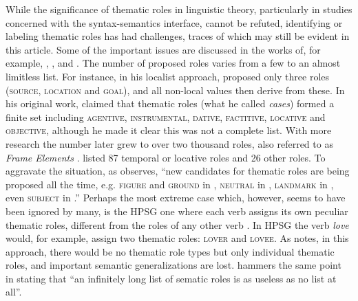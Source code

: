 \documentclass[output=paper]{langsci/langscibook}
\begin{document}
While the significance of thematic roles in linguistic theory, particularly in studies concerned with the syntax-semantics interface, cannot be refuted, identifying or labeling thematic roles has had challenges, traces of which may still be evident in this article. Some of the important issues are discussed in the works of, for example, \citet{Dowty1991}, \citet{Jackendoff1987}, \citet[689]{Newmeyer2010} and \citet[6]{KittilaEtAl2011}. The number of proposed roles varies from a few to an almost limitless list. For instance, in his localist approach, \citet{Anderson1971} proposed only three roles (\textsc{source, location} and \textsc{goal}), and all non-local values then derive from these. In his original work, \citet{Fillmore1968} claimed that thematic roles (what he called \textit{cases}) formed a finite set including \textsc{agentive, instrumental, dative, factitive, locative} and \textsc{objective,} although he made it clear this was not a complete list. With more research the number later grew to over two thousand roles, also referred to as \textit{Frame Elements} \citep{Fillmore1985}. \citet{Blake1930} listed 87 temporal or locative roles and 26 other roles. To aggravate the situation, as \citet[548-549]{Dowty1991} observes, “new candidates for thematic roles are being proposed all the time, e.g. \textsc{figure} and \textsc{ground} in \citealt{Talmy1985figureground}, \textsc{neutral} in \citealt{Rozwadowska1988}, \textsc{landmark} in \citealt{Jackendoff1982}, even \textsc{subject} in \citealt{Baker1985}.” Perhaps the most extreme case which, however, seems to have been ignored by many, is the HPSG one where each verb assigns its own peculiar thematic roles, different from the roles of any other verb \citep{PollardSag1994}. In HPSG the verb \textit{love} would, for example, assign two thematic roles: \textsc{lover} and \textsc{lovee}. As \citet{Dowty1989} notes, in this approach, there would be no thematic role types but only individual thematic roles, and important semantic generalizations are lost. \citet[52]{Payne1997} hammers the same point in stating that “an infinitely long list of sematic roles is as useless as no list at all”.
\end{document}
